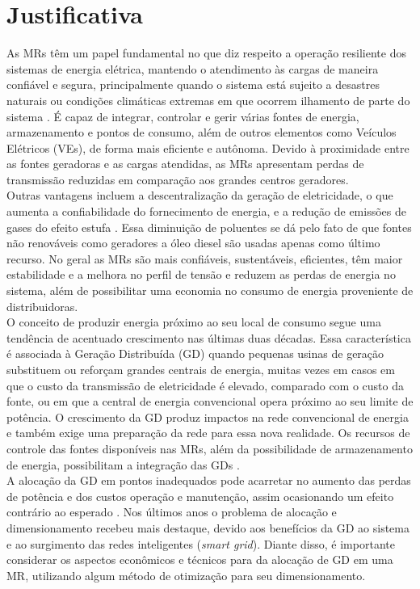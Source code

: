 \documentclass[]{IEEEphot}
\begin{document}
\section{Justificativa}
As MRs têm um papel fundamental no que diz respeito a operação resiliente dos sistemas de energia elétrica, mantendo o atendimento às cargas de maneira confiável e segura, principalmente quando o sistema está sujeito a desastres naturais ou condições climáticas extremas em que ocorrem ilhamento de parte do sistema \cite{Khodaei2014}. É capaz de integrar, controlar e gerir várias fontes de energia, armazenamento e pontos de consumo, além de outros elementos como Veículos Elétricos (VEs), de forma mais eficiente e autônoma. Devido à proximidade entre as fontes geradoras e as cargas atendidas, as MRs apresentam perdas de transmissão reduzidas em comparação aos grandes centros geradores.\\
Outras vantagens incluem a descentralização da geração de eletricidade, o que aumenta a confiabilidade do fornecimento de energia, e a redução de emissões de gases do efeito estufa \cite{Chowdhury2009}. Essa diminuição de poluentes se dá pelo fato de que fontes não renováveis como geradores a óleo diesel são usadas apenas como último recurso. No geral as MRs são mais confiáveis, sustentáveis, eficientes, têm maior estabilidade e a melhora no perfil de tensão e reduzem as perdas de energia no sistema, além de possibilitar uma economia no consumo de energia proveniente de distribuidoras.\\
O conceito de produzir energia próximo ao seu local de consumo segue uma tendência de acentuado crescimento nas últimas duas décadas. Essa característica é associada à Geração Distribuída (GD) quando pequenas usinas de geração substituem ou reforçam grandes centrais de energia, muitas vezes em casos em que o custo da transmissão de eletricidade é elevado, comparado com o custo da fonte, ou em que a central de energia convencional opera próximo ao seu limite de potência. O crescimento da GD produz impactos na rede convencional de energia e também exige uma preparação da rede para essa nova realidade. Os recursos de controle das fontes disponíveis nas MRs, além da possibilidade de armazenamento de energia, possibilitam a integração das GDs \cite{Pfitscher2013}.\\
A alocação da GD em pontos inadequados pode acarretar no aumento das perdas de potência e dos custos operação e manutenção, assim ocasionando um efeito contrário ao esperado \cite{Beromi2007}. Nos últimos anos o problema de alocação e dimensionamento recebeu mais destaque, devido aos benefícios da GD ao sistema e ao surgimento das redes inteligentes (\textit{smart grid}). Diante disso, é importante considerar os aspectos econômicos e técnicos para da alocação de GD em uma MR, utilizando algum método de otimização para seu dimensionamento.\\
\end{document}
